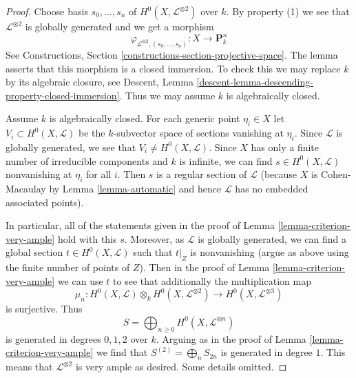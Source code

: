 \documentclass[10pt,a4paper]{amsart}
\theoremstyle{plain}
\theoremstyle{definition}
\theoremstyle{remark}
\numberwithin{equation}{subsection}
\begin{document}
\begin{proof}
Choose basis $s_0, \ldots, s_n$ of $H^0(X, \mathcal{L}^{\otimes 2})$
over $k$. By property (1) we see that $\mathcal{L}^{\otimes 2}$
is globally generated and we get a morphism
$$
\varphi_{\mathcal{L}^{\otimes 2}, (s_0, \ldots, s_n)} :
X \longrightarrow \mathbf{P}^n_k
$$
See Constructions, Section \ref{constructions-section-projective-space}.
The lemma asserts that this morphism is a closed immersion.
To check this we may replace $k$ by its algebraic closure, see
Descent, Lemma \ref{descent-lemma-descending-property-closed-immersion}.
Thus we may assume $k$ is algebraically closed.

\medskip\noindent
Assume $k$ is algebraically closed. For each generic point $\eta_i \in X$
let $V_i \subset H^0(X, \mathcal{L})$ be the $k$-subvector space of
sections vanishing at $\eta_i$. Since $\mathcal{L}$ is globally generated,
we see that $V_i \not = H^0(X, \mathcal{L})$. Since $X$ has only a
finite number of irreducible components and $k$ is infinite, we can find
$s \in H^0(X, \mathcal{L})$ nonvanishing at $\eta_i$ for all $i$.
Then $s$ is a regular section of $\mathcal{L}$ (because $X$ is
Cohen-Macaulay by Lemma \ref{lemma-automatic} and hence $\mathcal{L}$
has no embedded associated points).

\medskip\noindent
In particular, all of the statements given in the proof of
Lemma \ref{lemma-criterion-very-ample} hold with this $s$.
Moreover, as $\mathcal{L}$ is globally generated, we can find
a global section $t \in H^0(X, \mathcal{L})$ such that
$t|_Z$ is nonvanishing (argue as above using the finite number
of points of $Z$). Then in the proof of Lemma \ref{lemma-criterion-very-ample}
we can use $t$ to see that additionally the multiplication map
$$
\mu_n :
H^0(X, \mathcal{L}) \otimes_k H^0(X, \mathcal{L}^{\otimes 2})
\longrightarrow
H^0(X, \mathcal{L}^{\otimes 3})
$$
is surjective. Thus
$$
S = \bigoplus\nolimits_{n \geq 0} H^0(X, \mathcal{L}^{\otimes n})
$$
is generated in degrees $0, 1, 2$ over $k$. Arguing as in the
proof of Lemma \ref{lemma-criterion-very-ample} we find that
$S^{(2)} = \bigoplus_{n} S_{2n}$ is generated in degree $1$.
This means that $\mathcal{L}^{\otimes 2}$ is very ample as desired.
Some details omitted.
\end{proof}
\end{document}

